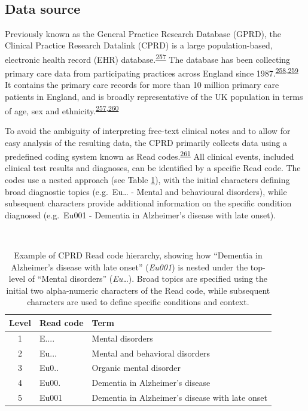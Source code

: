 \documentclass[a4paper, twoside]{templates/ociamthesis}
\begin{document}
~

\hypertarget{cprd-data-source}{%
\subsection{Data source}\label{cprd-data-source}}

Previously known as the General Practice Research Database (GPRD), the Clinical Practice Research Datalink (CPRD) is a large population-based, electronic health record (EHR) database.\textsuperscript{\protect\hyperlink{ref-herrett2015}{257}} The database has been collecting primary care data from participating practices across England since 1987.\textsuperscript{\protect\hyperlink{ref-williams2012}{258},\protect\hyperlink{ref-wood2001revitalizing}{259}} It contains the primary care records for more than 10 million primary care patients in England, and is broadly representative of the UK population in terms of age, sex and ethnicity.\textsuperscript{\protect\hyperlink{ref-herrett2015}{257},\protect\hyperlink{ref-mathur2014}{260}}

To avoid the ambiguity of interpreting free-text clinical notes and to allow for easy analysis of the resulting data, the CPRD primarily collects data using a predefined coding system known as Read codes.\textsuperscript{\protect\hyperlink{ref-booth1994}{261}} All clinical events, included clinical test results and diagnoses, can be identified by a specific Read code. The codes use a nested approach (see Table \ref{tab:readExample-table}), with the initial characters defining broad diagnostic topics (e.g.~Eu\ldots{} - Mental and behavioural disorders), while subsequent characters provide additional information on the specific condition diagnosed (e.g.~Eu001 - Dementia in Alzheimer's disease with late onset).

~





\begin{table}[H]

\caption[Example of CPRD Read code hierarchy]{\label{tab:readExample-table}Example of CPRD Read code hierarchy, showing how ``Dementia in Alzheimer's disease with late onset'' (\emph{Eu001}) is nested under the top-level of ``Mental disorders'' (\emph{Eu\ldots{}}). Broad topics are specified using the initial two alpha-numeric characters of the Read code, while subsequent characters are used to define specific conditions and context.}
\centering
\begin{tabular}[t]{cll}
\toprule
\textbf{Level} & \textbf{Read code} & \textbf{Term}\\
\midrule
1 & E.... & Mental disorders\\
2 & Eu... & Mental and behavioral disorders\\
3 & Eu0.. & Organic mental disorder\\
4 & Eu00. & Dementia in Alzheimer's disease\\
5 & Eu001 & Dementia in Alzheimer's disease with late onset\\
\bottomrule
\end{tabular}
\end{table}
\end{document}

